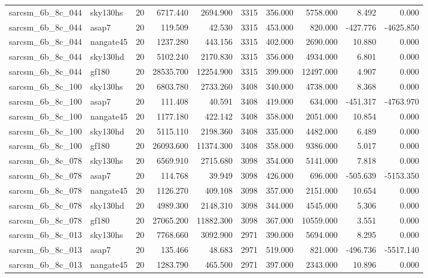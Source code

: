 \begin{longtable}{llrrrrrrrr}
sarcsm\_6b\_8c\_044 & sky130hs & 20 & 6717.440 & 2694.900 & 3315 & 356.000 & 5758.000 & 8.492 & 0.000 \\
sarcsm\_6b\_8c\_044 & asap7 & 20 & 119.509 & 42.530 & 3315 & 453.000 & 820.000 & -427.776 & -4625.850 \\
sarcsm\_6b\_8c\_044 & nangate45 & 20 & 1237.280 & 443.156 & 3315 & 402.000 & 2690.000 & 10.880 & 0.000 \\
sarcsm\_6b\_8c\_044 & sky130hd & 20 & 5102.240 & 2170.830 & 3315 & 356.000 & 4934.000 & 6.801 & 0.000 \\
sarcsm\_6b\_8c\_044 & gf180 & 20 & 28535.700 & 12254.900 & 3315 & 399.000 & 12497.000 & 4.907 & 0.000 \\
sarcsm\_6b\_8c\_100 & sky130hs & 20 & 6803.780 & 2733.260 & 3408 & 340.000 & 4738.000 & 8.368 & 0.000 \\
sarcsm\_6b\_8c\_100 & asap7 & 20 & 111.408 & 40.591 & 3408 & 419.000 & 634.000 & -451.317 & -4763.970 \\
sarcsm\_6b\_8c\_100 & nangate45 & 20 & 1177.180 & 422.142 & 3408 & 358.000 & 2051.000 & 10.854 & 0.000 \\
sarcsm\_6b\_8c\_100 & sky130hd & 20 & 5115.110 & 2198.360 & 3408 & 335.000 & 4482.000 & 6.489 & 0.000 \\
sarcsm\_6b\_8c\_100 & gf180 & 20 & 26093.600 & 11374.300 & 3408 & 358.000 & 9386.000 & 5.017 & 0.000 \\
sarcsm\_6b\_8c\_078 & sky130hs & 20 & 6569.910 & 2715.680 & 3098 & 354.000 & 5141.000 & 7.818 & 0.000 \\
sarcsm\_6b\_8c\_078 & asap7 & 20 & 114.768 & 39.949 & 3098 & 426.000 & 696.000 & -505.639 & -5153.350 \\
sarcsm\_6b\_8c\_078 & nangate45 & 20 & 1126.270 & 409.108 & 3098 & 357.000 & 2151.000 & 10.654 & 0.000 \\
sarcsm\_6b\_8c\_078 & sky130hd & 20 & 4989.300 & 2148.310 & 3098 & 344.000 & 4545.000 & 5.306 & 0.000 \\
sarcsm\_6b\_8c\_078 & gf180 & 20 & 27065.200 & 11882.300 & 3098 & 367.000 & 10559.000 & 3.551 & 0.000 \\
sarcsm\_6b\_8c\_013 & sky130hs & 20 & 7768.660 & 3092.900 & 2971 & 390.000 & 5694.000 & 8.295 & 0.000 \\
sarcsm\_6b\_8c\_013 & asap7 & 20 & 135.466 & 48.683 & 2971 & 519.000 & 821.000 & -496.736 & -5517.140 \\
sarcsm\_6b\_8c\_013 & nangate45 & 20 & 1283.790 & 465.500 & 2971 & 397.000 & 2343.000 & 10.896 & 0.000 \\

\end{longtable}
